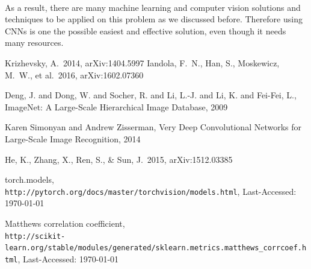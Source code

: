 \documentclass[12pt]{article}
\begin{document}
\paragraph{} As a result, there are many machine learning and computer vision solutions and techniques to be applied on this problem as we discussed before. Therefore using CNNs is one the possible easiest and effective solution, even though it needs many resources.  
\begin{thebibliography}{1} 
 Krizhevsky, A.\ 2014, arXiv:1404.5997 
 Iandola, F.~N., Han, S., Moskewicz, M.~W., et al.\ 2016, arXiv:1602.07360 
 
 Deng, J. and Dong, W. and Socher, R. and Li, L.-J. and Li, K. and Fei-Fei, L., ImageNet: A Large-Scale Hierarchical Image Database, 2009 

 Karen Simonyan and Andrew Zisserman, Very Deep Convolutional Networks for Large-Scale Image Recognition, 2014 

 He, K., Zhang, X., Ren, S., \& Sun, J.\ 2015, arXiv:1512.03385 
 
torch.models,
\\\texttt{http://pytorch.org/docs/master/torchvision/models.html}, Last-Accessed: \today{}

Matthews correlation coefficient,
\\\texttt{http://scikit-learn.org/stable/modules/generated/sklearn.metrics.matthews\_corrcoef.html}, Last-Accessed: \today{}
\end{thebibliography}
\end{document}
